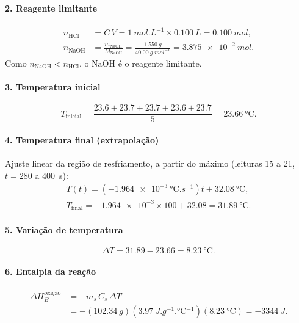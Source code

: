 \paragraph{2. Reagente limitante}
\[
\begin{aligned}
n_{\mathrm{HCl}} &= C\,V = \SI{1}{mol.L^{-1}}\times\SI{0,100}{L} = \SI{0,100}{mol},\\
n_{\mathrm{NaOH}} &= \frac{m_{\mathrm{NaOH}}}{M_{\mathrm{NaOH}}}
=\frac{\SI{1,550}{g}}{\SI{40,00}{g.mol^{-1}}}
=\SI{3,875e-2}{mol}.
\end{aligned}
\]
Como $n_{\mathrm{NaOH}} < n_{\mathrm{HCl}}$, o $\mathrm{NaOH}$ é o reagente limitante.

\paragraph{3. Temperatura inicial}
\[
T_{\text{inicial}}=\frac{\num{23,6}+\num{23,7}+\num{23,7}+\num{23,6}+\num{23,7}}{5}
=\SI{23,66}{\degreeCelsius}.
\]

\paragraph{4. Temperatura final (extrapolação)}
Ajuste linear da região de resfriamento, a partir do máximo (leituras 15 a 21, $t = 280$ a \SI{400}{s}):
\[
\begin{gathered}
T(t)=\left(\num{-1,964e-3}\ \si{\degreeCelsius.s^{-1}}\right)t+\SI{32,08}{\degreeCelsius},\\
T_{\text{final}}=\num{-1,964e-3}\times100+\num{32,08}=\SI{31,89}{\degreeCelsius}.
\end{gathered}
\]

\paragraph{5. Variação de temperatura}
\[
\Delta T=\num{31,89}-\num{23,66}=\SI{8,23}{\degreeCelsius}.
\]

\paragraph{6. Entalpia da reação}
\[
\begin{aligned}
\Delta H_B^{\text{reação}}&=-m_s\,C_s\,\Delta T
\\
&=-\left(\SI{102,34}{g}\right)\left(\SI{3,97}{J.g^{-1}.\degreeCelsius^{-1}}\right)\left(\SI{8,23}{\degreeCelsius}\right)
=\SI{-3344}{J}.
\end{aligned}
\]


